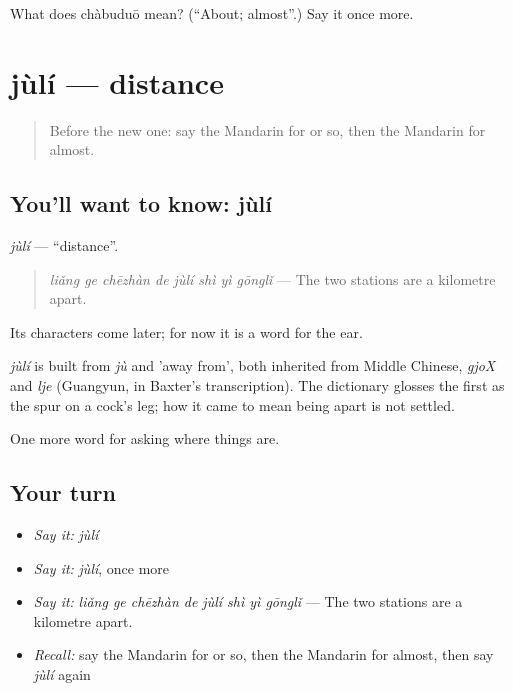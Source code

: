 \begin{tcolorbox}[breakable,colback=teal!4,colframe=teal!35!black,title={Before you move on}]
What does chàbuduō mean? (\textquotedblleft{}About; almost\textquotedblright{}.) Say it once more.
\end{tcolorbox}
\section[jùlí]{jùlí — distance}

\label{lesson:ZH-C205-juli}



\begin{quote}
Before the new one: say the Mandarin for or so, then the Mandarin for almost.
\end{quote}

\subsection*{You'll want to know: jùlí}
\emph{jùlí} — \textquotedblleft{}distance\textquotedblright{}.

\begin{quote}
\emph{liǎng ge chēzhàn de jùlí shì yì gōnglǐ} — The two stations are a kilometre apart.
\end{quote}

Its characters come later; for now it is a word for the ear.

\begin{cousinweb}
\emph{jùlí} is built from \emph{jù} and  'away from', both inherited from Middle Chinese, \emph{gjoX} and \emph{lje} (Guangyun, in Baxter's transcription). The dictionary glosses the first as the spur on a cock's leg; how it came to mean being apart is not settled.
\end{cousinweb}

\begin{grammarlens}[title={What you've built}]
One more word for asking where things are.
\end{grammarlens}

\subsection*{Your turn}
\begin{itemize}
\raggedright
  \item \emph{Say it:} \emph{jùlí}
  \item \emph{Say it:} \emph{jùlí}, once more
  \item \emph{Say it:} \emph{liǎng ge chēzhàn de jùlí shì yì gōnglǐ} — The two stations are a kilometre apart.
  \item \emph{Recall:} say the Mandarin for or so, then the Mandarin for almost, then say \emph{jùlí} again
\end{itemize}

